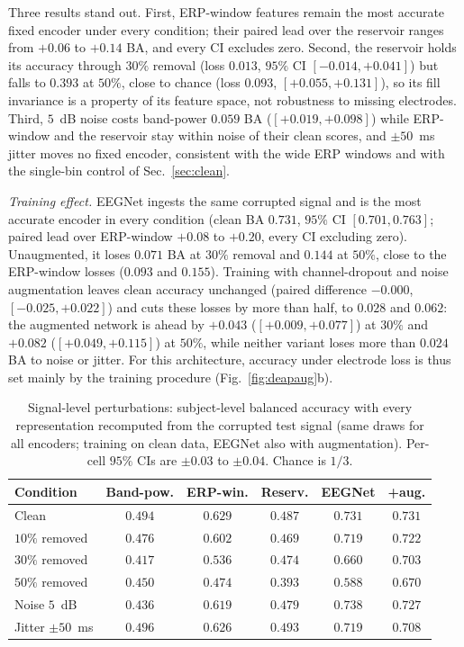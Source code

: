 \documentclass[conference]{IEEEtran}
\begin{document}
Three results stand out. First, ERP-window features remain the most accurate fixed encoder under every condition; their paired lead over the reservoir ranges from $+0.06$ to $+0.14$ BA, and every CI excludes zero. Second, the reservoir holds its accuracy through $30\%$ removal (loss $0.013$, $95\%$ CI $[-0.014,+0.041]$) but falls to $0.393$ at $50\%$, close to chance (loss $0.093$, $[+0.055,+0.131]$), so its fill invariance is a property of its feature space, not robustness to missing electrodes. Third, $5$~dB noise costs band-power $0.059$ BA ($[+0.019,+0.098]$) while ERP-window and the reservoir stay within noise of their clean scores, and $\pm50$~ms jitter moves no fixed encoder, consistent with the wide ERP windows and with the single-bin control of Sec.~\ref{sec:clean}.

\emph{Training effect.} EEGNet ingests the same corrupted signal and is the most accurate encoder in every condition (clean BA $0.731$, $95\%$ CI $[0.701,0.763]$; paired lead over ERP-window $+0.08$ to $+0.20$, every CI excluding zero). Unaugmented, it loses $0.071$ BA at $30\%$ removal and $0.144$ at $50\%$, close to the ERP-window losses ($0.093$ and $0.155$). Training with channel-dropout and noise augmentation leaves clean accuracy unchanged (paired difference $-0.000$, $[-0.025,+0.022]$) and cuts these losses by more than half, to $0.028$ and $0.062$: the augmented network is ahead by $+0.043$ ($[+0.009,+0.077]$) at $30\%$ and $+0.082$ ($[+0.049,+0.115]$) at $50\%$, while neither variant loses more than $0.024$ BA to noise or jitter. For this architecture, accuracy under electrode loss is thus set mainly by the training procedure (Fig.~\ref{fig:deapaug}b).

\begin{table}[t]
\caption{Signal-level perturbations: subject-level balanced accuracy with every representation recomputed from the corrupted test signal (same draws for all encoders; training on clean data, EEGNet also with augmentation). Per-cell $95\%$ CIs are $\pm0.03$ to $\pm0.04$. Chance is $1/3$.}
\label{tab:rawsignal}
\centering
\small
\setlength{\tabcolsep}{3pt}
\begin{tabular}{lccccc}
\toprule
Condition & Band-pow. & ERP-win. & Reserv. & EEGNet & +aug. \\
\midrule
Clean & $0.494$ & $0.629$ & $0.487$ & $0.731$ & $0.731$ \\
$10\%$ removed & $0.476$ & $0.602$ & $0.469$ & $0.719$ & $0.722$ \\
$30\%$ removed & $0.417$ & $0.536$ & $0.474$ & $0.660$ & $0.703$ \\
$50\%$ removed & $0.450$ & $0.474$ & $0.393$ & $0.588$ & $0.670$ \\
Noise $5$~dB & $0.436$ & $0.619$ & $0.479$ & $0.738$ & $0.727$ \\
Jitter $\pm50$~ms & $0.496$ & $0.626$ & $0.493$ & $0.719$ & $0.708$ \\
\bottomrule
\end{tabular}
\end{table}
\end{document}
